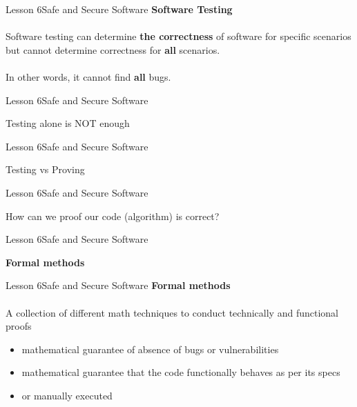 \documentclass[aspectratio=1610]{beamer}
\begin{document}
\begin{frame}{Lesson 6}{Safe and Secure Software}
\LARGE
\textbf{Software Testing}\\~\\
Software testing can determine \textbf{the correctness} of software for specific 
scenarios but cannot determine correctness for \textbf{all} scenarios.\\~\\
In other words, it cannot find \textbf{all} bugs.
\end{frame}



\begin{frame}{Lesson 6}{Safe and Secure Software}
\Huge
\begin{center}
Testing alone is NOT enough
\end{center}
\end{frame}



\begin{frame}{Lesson 6}{Safe and Secure Software}
\Huge
\begin{center}
Testing vs Proving
\end{center}
\end{frame}



\begin{frame}{Lesson 6}{Safe and Secure Software}
\Huge
\begin{center}
How can we proof our code (algorithm) is correct?
\end{center}
\end{frame}


\begin{frame}{Lesson 6}{Safe and Secure Software}
\Huge
\begin{center}
\textbf{Formal methods}
\end{center}
\end{frame}


\begin{frame}{Lesson 6}{Safe and Secure Software}
\LARGE
\textbf{Formal methods}\\~\\
A collection of different math techniques to conduct technically and functional proofs
\begin{itemize}
    \item mathematical guarantee of absence of bugs or vulnerabilities
    \item mathematical guarantee that the code functionally behaves as per its specs
    \item or manually executed
\end{itemize}
\end{frame}
\end{document}
